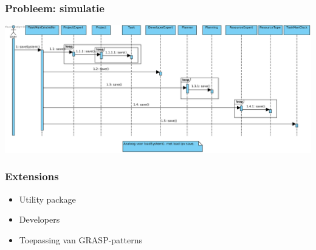 \documentclass{beamer}
\begin{document}
\begin{frame}
\frametitle {Probleem: simulatie}
\includegraphics[scale=0.4]{figures/mementomori}


\end{frame}




%

\begin{frame}
\frametitle{Extensions}
\begin{itemize}
\item Utility package\newline
\newline
\item Developers\newline
\newline
\item Toepassing van GRASP-patterns
\end{itemize}

\end{frame}

%
\end{document}
